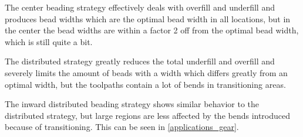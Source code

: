 The center beading strategy effectively deals with overfill and underfill and produces bead widths which are the optimal bead width in all locations, but in the center the bead widths are within a factor 2 off from the optimal bead width, which is still quite a bit.

The distributed strategy greatly reduces the total underfill and overfill and severely limits the amount of beads with a width which differs greatly from an optimal width, but the toolpaths contain a lot of bends in transitioning areas.

The inward distributed beading strategy shows similar behavior to the distributed strategy, but large regions are less affected by the bends introduced because of transitioning.
This can be seen in \cref{applications_gear}.



